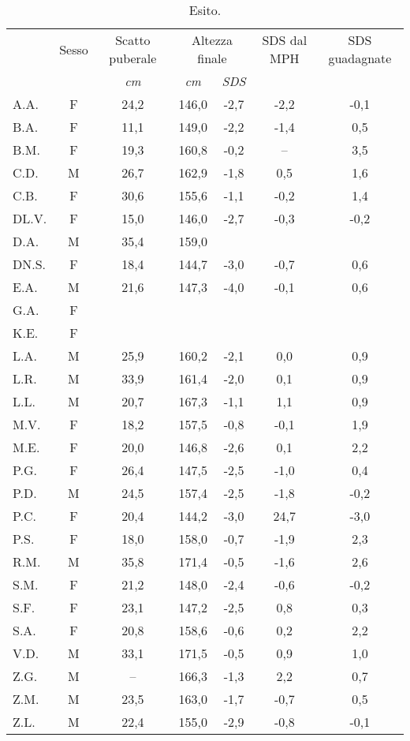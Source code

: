 \begin{table}[!h]
\begin{center}
\begin{tabular}{lcccccc}
\toprule
 & Sesso  & Scatto puberale & \multicolumn{2}{c}{Altezza finale} 	& SDS dal MPH	& SDS guadagnate \\
\cmidrule(r){4-5}
  & & \emph{cm} & \emph{cm} 	& \emph{SDS}  	   	&		& 			 	\\
\midrule
A.A.	& F & 24,2 & 146,0 & -2,7  & -2,2  & -0,1    \\
B.A.	& F & 11,1 & 149,0 & -2,2  & -1,4  & 0,5     \\
B.M.	& F & 19,3 & 160,8 & -0,2  & --    & 3,5     \\
C.D.	& M & 26,7 & 162,9 & -1,8  & 0,5   & 1,6     \\
C.B.	& F & 30,6 & 155,6 & -1,1  & -0,2  & 1,4     \\
DL.V.	& F & 15,0 & 146,0 & -2,7  & -0,3  & -0,2    \\
D.A.	& M & 35,4 & 159,0 &       &       &         \\
DN.S.	& F & 18,4 & 144,7 & -3,0  & -0,7  & 0,6     \\
E.A.	& M & 21,6 & 147,3 & -4,0  & -0,1  & 0,6     \\
G.A.	& F &      &       &       &       &         \\
K.E.	& F &      &       &       &       &         \\
L.A.	& M & 25,9 & 160,2 & -2,1  & 0,0   & 0,9     \\
L.R.	& M & 33,9 & 161,4 & -2,0  & 0,1   & 0,9     \\
L.L.	& M & 20,7 & 167,3 & -1,1  & 1,1   & 0,9     \\
M.V.	& F & 18,2 & 157,5 & -0,8  & -0,1  & 1,9     \\
M.E.	& F & 20,0 & 146,8 & -2,6  & 0,1   & 2,2     \\
P.G.	& F & 26,4 & 147,5 & -2,5  & -1,0  & 0,4     \\
P.D.	& M & 24,5 & 157,4 & -2,5  & -1,8  & -0,2    \\
P.C.	& F & 20,4 & 144,2 & -3,0  & 24,7  & -3,0    \\
P.S.	& F & 18,0 & 158,0 & -0,7  & -1,9  & 2,3     \\
R.M.	& M & 35,8 & 171,4 & -0,5  & -1,6  & 2,6    \\
S.M.	& F & 21,2 & 148,0 & -2,4  & -0,6  & -0,2    \\
S.F.	& F & 23,1 & 147,2 & -2,5  & 0,8   & 0,3     \\
S.A.	& F & 20,8 & 158,6 & -0,6  & 0,2   & 2,2     \\
V.D.	& M & 33,1 & 171,5 & -0,5  & 0,9   & 1,0     \\
Z.G.	& M & --   & 166,3 & -1,3  & 2,2   & 0,7   \\
Z.M.	& M & 23,5 & 163,0 & -1,7  & -0,7  & 0,5     \\
Z.L.	& M & 22,4 & 155,0 & -2,9  & -0,8  & -0,1    \\
\bottomrule
\end{tabular}
\end{center}
\caption{Esito.}
\label{tab:Esito}
\end{table}

